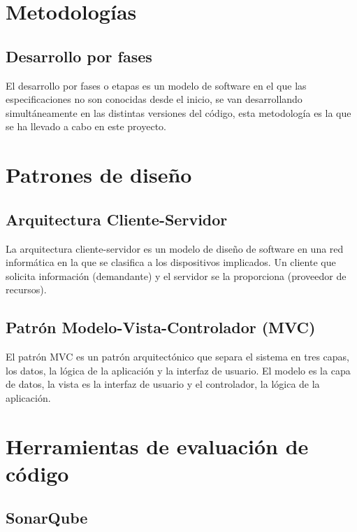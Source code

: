 \section{Metodologías}

\subsection{Desarrollo por fases}

El desarrollo por fases o etapas es un modelo de software en el que las especificaciones no son conocidas desde el inicio, se van desarrollando simultáneamente en las distintas versiones del código, esta metodología es la que se ha llevado a cabo en este proyecto.



\section{Patrones de diseño}

\subsection{Arquitectura Cliente-Servidor}

La arquitectura cliente-servidor es un modelo de diseño de software en una red informática en la que se clasifica a los dispositivos implicados. Un cliente que solicita información (demandante) y el servidor se la proporciona (proveedor de recursos).

\subsection{Patrón Modelo-Vista-Controlador (MVC)}

El patrón MVC es un patrón arquitectónico que separa el sistema en tres capas, los datos, la lógica de la aplicación y la interfaz de usuario. El modelo es la capa de datos, la vista es la interfaz de usuario y el controlador, la lógica de la aplicación.



\section{Herramientas de evaluación de código}

\subsection{SonarQube}

